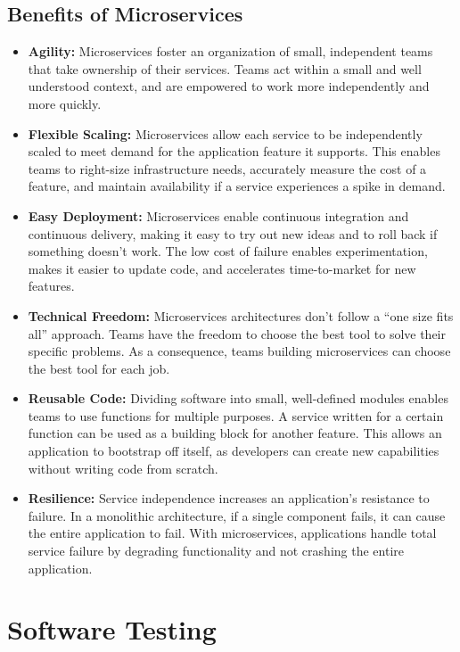 \subsection{Benefits of Microservices}
\begin{itemize}
    \item \textbf{Agility:} Microservices foster an organization of small, independent teams that take ownership of their services. Teams act within a small and well understood context, and are empowered to work more independently and more quickly.
    \item \textbf{Flexible Scaling:} Microservices allow each service to be independently scaled to meet demand for the application feature it supports. This enables teams to right-size infrastructure needs, accurately measure the cost of a feature, and maintain availability if a service experiences a spike in demand.
    \item \textbf{Easy Deployment:} Microservices enable continuous integration and continuous delivery, making it easy to try out new ideas and to roll back if something doesn’t work. The low cost of failure enables experimentation, makes it easier to update code, and accelerates time-to-market for new features.
    \item \textbf{Technical Freedom:} Microservices architectures don’t follow a “one size fits all” approach. Teams have the freedom to choose the best tool to solve their specific problems. As a consequence, teams building microservices can choose the best tool for each job.
    \item \textbf{Reusable Code:} Dividing software into small, well-defined modules enables teams to use functions for multiple purposes. A service written for a certain function can be used as a building block for another feature. This allows an application to bootstrap off itself, as developers can create new capabilities without writing code from scratch.
    \item \textbf{Resilience:} Service independence increases an application’s resistance to failure. In a monolithic architecture, if a single component fails, it can cause the entire application to fail. With microservices, applications handle total service failure by degrading functionality and not crashing the entire application.
\end{itemize}

\newpage

\section{Software Testing}

